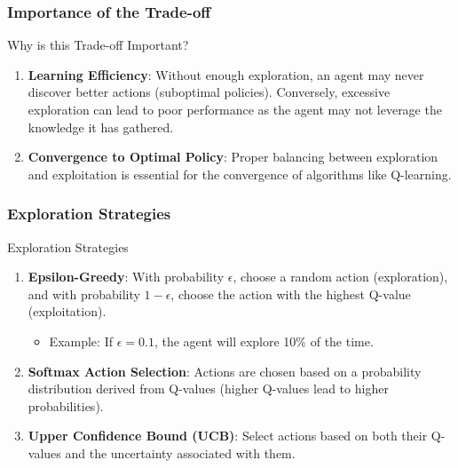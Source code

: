 \documentclass{beamer}
\begin{document}
\begin{frame}[fragile]
    \frametitle{Importance of the Trade-off}
    \begin{block}{Why is this Trade-off Important?}
        \begin{enumerate}
            \item \textbf{Learning Efficiency}: 
                Without enough exploration, an agent may never discover better actions (suboptimal policies). Conversely, excessive exploration can lead to poor performance as the agent may not leverage the knowledge it has gathered.
            \item \textbf{Convergence to Optimal Policy}:
                Proper balancing between exploration and exploitation is essential for the convergence of algorithms like Q-learning.
        \end{enumerate}
    \end{block}
\end{frame}

\begin{frame}[fragile]
    \frametitle{Exploration Strategies}
    \begin{block}{Exploration Strategies}
        \begin{enumerate}
            \item \textbf{Epsilon-Greedy}:
                With probability \( \epsilon \), choose a random action (exploration), and with probability \( 1 - \epsilon \), choose the action with the highest Q-value (exploitation).
                \begin{itemize}
                    \item Example: If \( \epsilon = 0.1 \), the agent will explore 10\% of the time.
                \end{itemize}
            \item \textbf{Softmax Action Selection}:
                Actions are chosen based on a probability distribution derived from Q-values (higher Q-values lead to higher probabilities).
            \item \textbf{Upper Confidence Bound (UCB)}:
                Select actions based on both their Q-values and the uncertainty associated with them.
        \end{enumerate}
    \end{block}
\end{frame}
\end{document}
